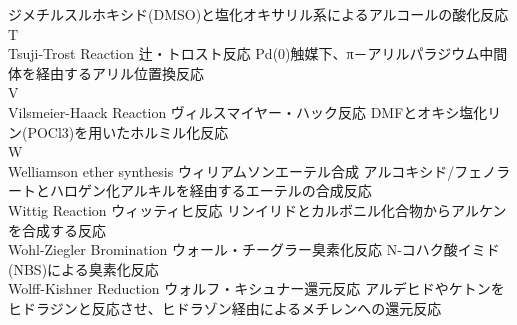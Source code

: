 \documentclass[dvipdfmx,uplatex]{jsarticle}
\begin{document}
	ジメチルスルホキシド(DMSO)と塩化オキサリル系によるアルコールの酸化反応 \\
T \\
Tsuji-Trost Reaction	辻・トロスト反応
	Pd(0)触媒下、π－アリルパラジウム中間体を経由するアリル位置換反応 \\
V \\
Vilsmeier-Haack Reaction	ヴィルスマイヤー・ハック反応
	DMFとオキシ塩化リン(POCl3)を用いたホルミル化反応 \\
W \\
Welliamson ether synthesis	ウィリアムソンエーテル合成
	アルコキシド/フェノラートとハロゲン化アルキルを経由するエーテルの合成反応 \\
Wittig Reaction	ウィッティヒ反応
	リンイリドとカルボニル化合物からアルケンを合成する反応 \\
Wohl-Ziegler Bromination	ウォール・チーグラー臭素化反応
	N-コハク酸イミド(NBS)による臭素化反応 \\
Wolff-Kishner Reduction	ウォルフ・キシュナー還元反応
	アルデヒドやケトンをヒドラジンと反応させ、ヒドラゾン経由によるメチレンへの還元反応\\
\end{document}
